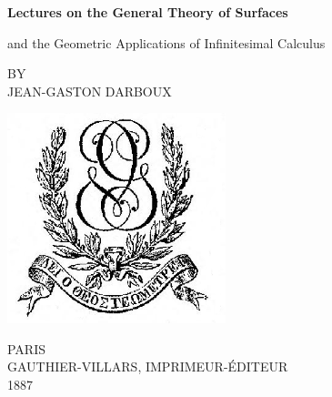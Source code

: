 \clearpage
\newcommand\nbvspace[1][3]{\vspace*{\stretch{#1}}}
\newcommand\nbstretchyspace{\spaceskip0.5em plus 0.25em minus 0.25em}
\newcommand{\nbtitlestretch}{\spaceskip0.6em}
\pagestyle{empty}
\begin{center}
\bfseries
\nbvspace[1]
\Huge
{\huge
Lectures on the General Theory of Surfaces}

\normalsize

and the Geometric Applications of Infinitesimal Calculus

\nbvspace[1]
\small BY\\
\Large JEAN-GASTON DARBOUX\\[0.5em]

\nbvspace[2]

\includegraphics[width=2.5in]{../images/Logo_Gauthier-Villars.png}
\nbvspace[3]
\normalsize

PARIS\\
\large
GAUTHIER-VILLARS, IMPRIMEUR-\'EDITEUR \\
1887
\nbvspace[1]
\end{center}